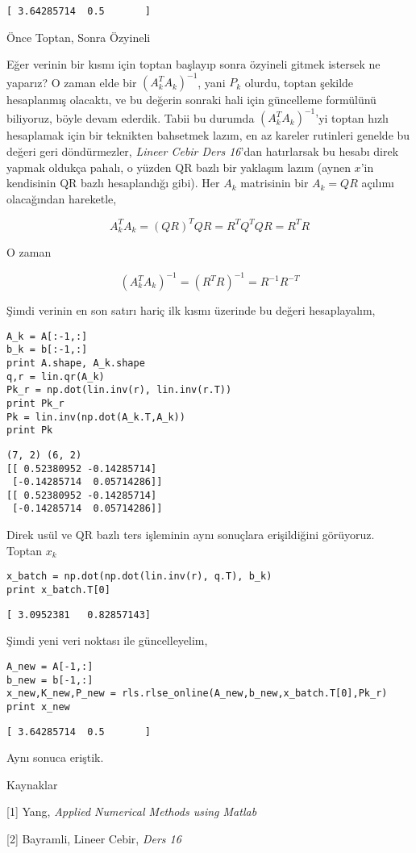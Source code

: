 \documentclass[12pt,fleqn]{article}\usepackage{../../common}
\begin{document}
\begin{verbatim}
[ 3.64285714  0.5       ]
\end{verbatim}

Önce Toptan, Sonra Özyineli

Eğer verinin bir kısmı için toptan başlayıp sonra özyineli gitmek istersek
ne yaparız? O zaman elde bir $(A_k^TA_k)^{-1}$, yani $P_{k}$ olurdu, toptan
şekilde hesaplanmış olacaktı, ve bu değerin sonraki hali için güncelleme
formülünü biliyoruz, böyle devam ederdik. Tabii bu durumda
$(A_k^TA_k)^{-1}$'yi toptan hızlı hesaplamak için bir teknikten bahsetmek
lazım, en az kareler rutinleri genelde bu değeri geri döndürmezler, {\em
  Lineer Cebir Ders 16}'dan hatırlarsak bu hesabı direk yapmak oldukça
pahalı, o yüzden QR bazlı bir yaklaşım lazım (aynen $x$'in kendisinin QR
bazlı hesaplandığı gibi). Her $A_k$ matrisinin bir $A_k = QR$ açılımı
olacağından hareketle, 

$$ A_k^TA_k = (QR)^TQR = R^TQ^TQR = R^TR $$

O zaman 

$$ (A_k^TA_k)^{-1} = (R^TR)^{-1} = R^{-1}R^{-T} $$

Şimdi verinin en son satırı hariç ilk kısmı üzerinde bu değeri hesaplayalım,

\begin{verbatim}
A_k = A[:-1,:]
b_k = b[:-1,:]
print A.shape, A_k.shape
q,r = lin.qr(A_k)
Pk_r = np.dot(lin.inv(r), lin.inv(r.T))
print Pk_r
Pk = lin.inv(np.dot(A_k.T,A_k))
print Pk
\end{verbatim}

\begin{verbatim}
(7, 2) (6, 2)
[[ 0.52380952 -0.14285714]
 [-0.14285714  0.05714286]]
[[ 0.52380952 -0.14285714]
 [-0.14285714  0.05714286]]
\end{verbatim}

Direk usül ve QR bazlı ters işleminin aynı sonuçlara erişildiğini
görüyoruz. Toptan $x_k$

\begin{verbatim}
x_batch = np.dot(np.dot(lin.inv(r), q.T), b_k)
print x_batch.T[0]
\end{verbatim}

\begin{verbatim}
[ 3.0952381   0.82857143]
\end{verbatim}

Şimdi yeni veri noktası ile güncelleyelim,

\begin{verbatim}
A_new = A[-1,:]
b_new = b[-1,:]
x_new,K_new,P_new = rls.rlse_online(A_new,b_new,x_batch.T[0],Pk_r)
print x_new
\end{verbatim}

\begin{verbatim}
[ 3.64285714  0.5       ]
\end{verbatim}

Aynı sonuca eriştik. 
 
Kaynaklar

[1] Yang, {\em Applied Numerical Methods using Matlab}

[2] Bayramli, Lineer Cebir, {\em Ders 16}
\end{document}
